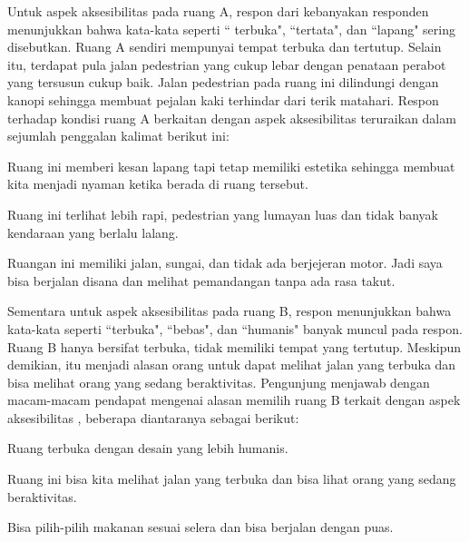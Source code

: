 \documentclass[11pt]{simartadv} %
\begin{document}
Untuk aspek aksesibilitas pada ruang A, respon dari kebanyakan responden menunjukkan bahwa kata-kata seperti `` terbuka", ``tertata", dan ``lapang" sering disebutkan. Ruang A sendiri mempunyai tempat terbuka dan tertutup. Selain itu, terdapat pula jalan pedestrian yang cukup lebar dengan penataan perabot yang tersusun cukup baik. Jalan pedestrian pada ruang ini dilindungi dengan kanopi sehingga membuat pejalan kaki terhindar dari terik matahari. Respon terhadap kondisi ruang A berkaitan dengan aspek aksesibilitas teruraikan dalam sejumlah penggalan kalimat berikut ini:

\begin{quoting}
    Ruang ini memberi kesan lapang tapi tetap memiliki estetika sehingga membuat kita menjadi nyaman ketika berada di ruang tersebut.
\end{quoting}

\begin{quoting}
    Ruang ini terlihat lebih rapi, pedestrian yang lumayan luas dan tidak banyak kendaraan yang berlalu lalang.
\end{quoting}

\begin{quoting}
    Ruangan ini memiliki jalan, sungai, dan tidak ada berjejeran motor. Jadi saya bisa berjalan disana dan melihat pemandangan tanpa ada rasa takut.
\end{quoting}

Sementara untuk aspek aksesibilitas pada ruang B, respon menunjukkan bahwa kata-kata seperti ``terbuka", ``bebas", dan ``humanis" banyak muncul pada respon. Ruang B hanya bersifat terbuka, tidak memiliki tempat yang tertutup. Meskipun demikian, itu menjadi alasan orang untuk dapat melihat jalan yang terbuka dan bisa melihat orang yang sedang beraktivitas. Pengunjung menjawab dengan macam-macam pendapat mengenai alasan memilih ruang B terkait dengan aspek aksesibilitas , beberapa diantaranya sebagai berikut:

\begin{quoting}
    Ruang terbuka dengan desain yang lebih humanis.
\end{quoting}

\begin{quoting}
    Ruang ini bisa kita melihat jalan yang terbuka dan bisa lihat orang yang sedang beraktivitas.
\end{quoting}

\begin{quoting}
    Bisa pilih-pilih makanan sesuai selera dan bisa berjalan dengan puas.
\end{quoting}
\end{document}
